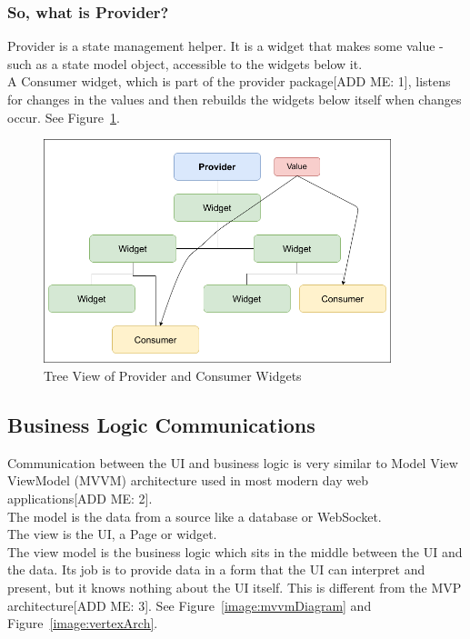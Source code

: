 \subsubsection{So, what is Provider?}
Provider is a state management helper. It is a widget that makes some value - such as a state model object, accessible to the widgets below it.
\\ A Consumer widget, which is part of the provider package[ADD ME: 1], listens for changes in the values and then rebuilds the widgets below itself when changes occur.
See Figure~\ref{image:providerTree}.

\begin{figure}[h!]
    \caption{Tree View of Provider and Consumer Widgets}
    \label{image:providerTree}
    \centering
    \includegraphics[width=0.9\textwidth]{images/consumer_tree_with_value.png}
\end{figure}

\subsection{Business Logic Communications}
Communication between the UI and business logic is very similar to Model View ViewModel (MVVM) architecture used in most modern day web applications[ADD ME: 2].
\\ The model is the data from a source like a database or WebSocket.
\\ The view is the UI, a Page or widget.
\\ The view model is the business logic which sits in the middle between the UI and the data. Its job is to provide data in a form that the UI can interpret and present, but it knows nothing about the UI itself. This is different from the MVP architecture[ADD ME: 3].
See Figure~\ref{image:mvvmDiagram} and Figure~\ref{image:vertexArch}.

